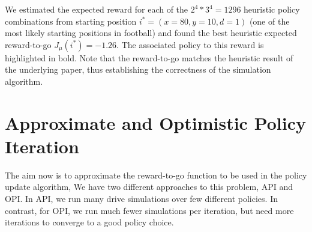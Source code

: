 \documentclass[11pt, oneside]{article}   	%
\begin{document}
We estimated the expected reward for each of the $2^4*3^4 = 1296$ heuristic policy combinations from starting position $i^* = (x=80, y=10, d=1)$ (one of the most likely starting positions in football) and found the best heuristic expected reward-to-go $J_{\mu}(i^*) = -1.26$. The associated policy to this reward is highlighted in bold. Note that the reward-to-go matches the heuristic result of the underlying paper, thus establishing the correctness of the simulation algorithm.

\section{Approximate and Optimistic Policy Iteration}
The aim now is to approximate the reward-to-go function to be used in the policy update algorithm, We have two different approaches to this problem, API and OPI. In API, we run many drive simulations over few different policies. In contrast, for OPI, we run much fewer simulations per iteration, but need more iterations to converge to a good policy choice.\\
\end{document}
